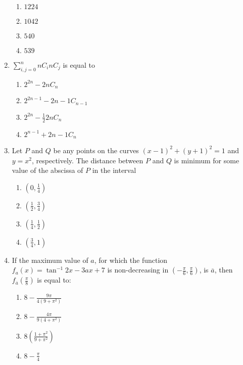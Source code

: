 \documentclass[journal]{IEEEtran}
\newcommand{\brak}[1]{\left( #1 \right)}
\begin{document}
\begin{enumerate}
        \begin{multicols}{4}
        \begin{enumerate}
        \item $1224$
        \item $1042$
        \item $540$
        \item $539$
        \end{enumerate}
        \end{multicols}
        
    \item $\sum_{i,j=0}^{n} {n}C_{i} {n}C_{j}$ is equal to
 
        \begin{enumerate}
        \item $2^{2n} - {2n}C_{n}$
        \item $2^{2n-1} - {2n-1}C_{n-1}$
        \item $2^{2n} - \frac{1}{2} {2n}C_{n}$
        \item $2^{n-1} + {2n-1}C_{n}$
        \end{enumerate}

    \item Let $P$ and $Q$ be any points on the curves $\brak{x - 1}^{2} + \brak{y + 1}^{2} = 1$ and $y = x^{2}$, respectively. The distance between $P$ and $Q$ is minimum for some value of the abscissa of $P$ in the interval

        \begin{multicols}{4}
        \begin{enumerate}
        \item $\brak{0, \frac{1}{4}}$
        \item $\brak{\frac{1}{2}, \frac{3}{4}}$
        \item $\brak{\frac{1}{4}, \frac{1}{2}}$
        \item $\brak{\frac{3}{4}, 1}$
        \end{enumerate}
        \end{multicols}

    \item If the maximum value of $a$, for which the function $f_{a} \brak{x} = \tan^{-1} 2x - 3ax + 7$ is non-decreasing in $\brak{-\frac{\pi}{6}, \frac{\pi}{6}}$, is $\overline{a}$, then $f_{\overline{a}} \brak{\frac{\pi}{8}}$ is equal to:

        \begin{multicols}{4}
        \begin{enumerate}
        \item $8 - \frac{9\pi}{4\brak{9 + \pi^{2}}}$
        \item $8 - \frac{4\pi}{9\brak{4 + \pi^{2}}}$
        \item $8 \brak{\frac{1 + \pi^{2}}{9 + \pi^{2}}}$
        \item $8 - \frac{\pi}{4}$
        \end{enumerate}
        \end{multicols}


\end{enumerate}
\end{document}

